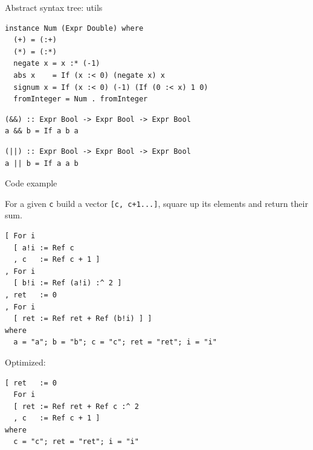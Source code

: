 \documentclass[handout]{beamer}
\begin{document}
\begin{frame}[fragile]{Abstract syntax tree: utils}

\begin{lstlisting}
instance Num (Expr Double) where
  (+) = (:+)
  (*) = (:*)
  negate x = x :* (-1)
  abs x    = If (x :< 0) (negate x) x
  signum x = If (x :< 0) (-1) (If (0 :< x) 1 0)
  fromInteger = Num . fromInteger
\end{lstlisting}

\begin{lstlisting}
(&&) :: Expr Bool -> Expr Bool -> Expr Bool
a && b = If a b a
\end{lstlisting}

\begin{lstlisting}
(||) :: Expr Bool -> Expr Bool -> Expr Bool
a || b = If a a b
\end{lstlisting}

\end{frame}

\begin{frame}[fragile]{Code example}

For a given {\tt c} build a vector {\tt [c, c+1...]}, square up its elements and return their sum.

\begin{lstlisting}
[ For i
  [ a!i := Ref c
  , c   := Ref c + 1 ]
, For i
  [ b!i := Ref (a!i) :^ 2 ]
, ret   := 0
, For i
  [ ret := Ref ret + Ref (b!i) ] ]
where
  a = "a"; b = "b"; c = "c"; ret = "ret"; i = "i"
\end{lstlisting}

Optimized:

\begin{lstlisting}
[ ret   := 0
  For i
  [ ret := Ref ret + Ref c :^ 2
  , c   := Ref c + 1 ]
where
  c = "c"; ret = "ret"; i = "i"
\end{lstlisting}

\end{frame}
\end{document}
